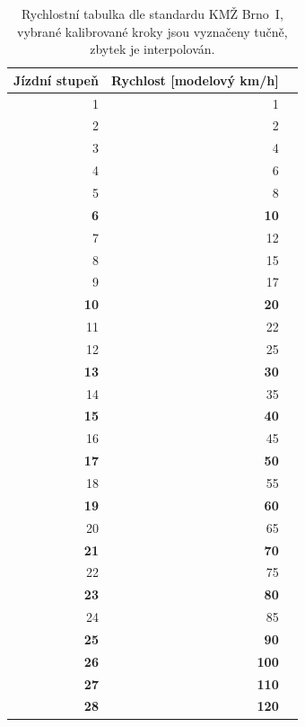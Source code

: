 \begin{table}[h]
	\begin{tabularx}{0.66\textwidth}{rrX}
		\toprule
		Jízdní stupeň & Rychlost [modelový km/h] \\
		\midrule
		1 & 1 \\
		2 & 2 \\
		3 & 4 \\
		4 & 6 \\
		5 & 8 \\
		\textbf{6} & \textbf{10} \\
		7 & 12 \\
		8 & 15 \\
		9 & 17 \\
		\textbf{10} & \textbf{20} \\
		11 & 22 \\
		12 & 25 \\
		\textbf{13} & \textbf{30} \\
		14 & 35 \\
		\textbf{15} & \textbf{40} \\
		16 & 45 \\
		\textbf{17} & \textbf{50} \\
		18 & 55 \\
		\textbf{19} & \textbf{60} \\
		20 & 65 \\
		\textbf{21} & \textbf{70} \\
		22 & 75 \\
		\textbf{23} & \textbf{80} \\
		24 & 85 \\
		\textbf{25} & \textbf{90} \\
		\textbf{26} & \textbf{100} \\
		\textbf{27} & \textbf{110} \\
		\textbf{28} & \textbf{120} \\
		\bottomrule
	\end{tabularx}
	\caption{Rychlostní tabulka dle standardu KMŽ Brno~I, vybrané kalibrované
	kroky jsou vyznačeny tučně, zbytek je interpolován.}
	\label{fig:step-to-speed}
\end{table}
